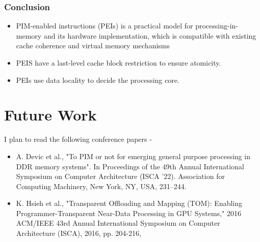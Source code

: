 \documentclass[a4paper,12pt, final]{report}
\begin{document}
\subsection{Conclusion}
\begin{itemize}
  \setlength\itemsep{0em}
  \item PIM-enabled instructions (PEIs) is a practical model for processing-in-memory 
    and its hardware implementation, which is compatible with existing cache coherence 
    and virtual memory mechanisms
  \item PEIS have a last-level cache block restriction to ensure atomicity. 
  \item PEIs use data locality to decide the processing core.
\end{itemize}
 
\chapter{Future Work}
I plan to read the following conference papers -
\begin{itemize}
  \setlength\itemsep{0em}
  \item A. Devic  et al., "To PIM or not for emerging general purpose processing in
    DDR memory systems". In Proceedings of the 49th Annual International
    Symposium on Computer Architecture (ISCA '22). Association for Computing
    Machinery, New York, NY, USA, 231–244.
  \item K. Hsieh et al., "Transparent Offloading and Mapping (TOM): Enabling Programmer-Transparent Near-Data Processing in GPU Systems," 2016 ACM/IEEE 43rd Annual International Symposium on Computer Architecture (ISCA), 2016, pp. 204-216,
 
\end{itemize}


{}
\end{document}
